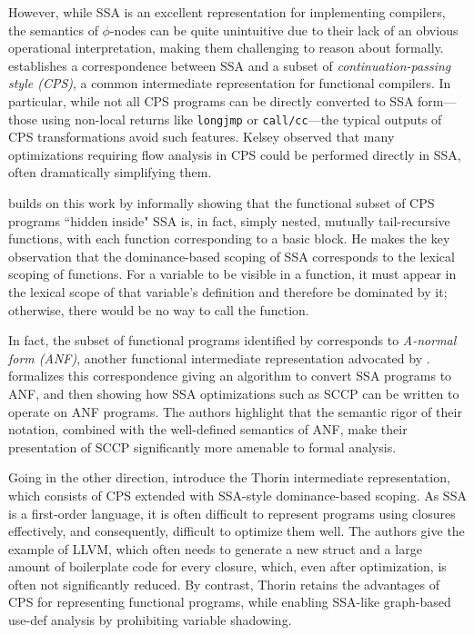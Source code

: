 \documentclass[acmsmall,screen,review]{acmart}
\begin{document}
However, while SSA is an excellent representation for implementing compilers, the semantics of
$\phi$-nodes can be quite unintuitive due to their lack of an obvious operational interpretation,
making them challenging to reason about formally. \citet{kelsey-95-cps} establishes a correspondence
between SSA and a subset of \emph{continuation-passing style (CPS)}, a common intermediate
representation for functional compilers. In particular, while not all CPS programs can be directly
converted to SSA form—those using non-local returns like \texttt{longjmp} or \texttt{call/cc}—the
typical outputs of CPS transformations avoid such features. Kelsey observed that many optimizations
requiring flow analysis in CPS could be performed directly in SSA, often dramatically simplifying
them.

\citet{appel-ssa} builds on this work by informally showing that the functional subset of CPS
programs ``hidden inside" SSA is, in fact, simply nested, mutually tail-recursive functions,
with each function corresponding to a basic block. He makes the key observation that the
dominance-based scoping of SSA corresponds to the lexical scoping of functions. For a variable to be
visible in a function, it must appear in the lexical scope of that variable's definition and
therefore be dominated by it; otherwise, there would be no way to call the function.

In fact, the subset of functional programs identified by \citet{appel-ssa} corresponds to
\emph{A-normal form (ANF)}, another functional intermediate representation advocated by
\citet{flanagan-93-anf}. \citet{chakravarty-functional-ssa-2003} formalizes this correspondence
giving an algorithm to convert SSA programs to ANF, and then showing how SSA optimizations such as
SCCP can be written to operate on ANF programs. The authors highlight that the semantic rigor of
their notation, combined with the well-defined semantics of ANF, make their presentation of SCCP
significantly more amenable to formal analysis.

Going in the other direction, \citet{thorin-12} introduce the Thorin intermediate representation,
which consists of CPS extended with SSA-style dominance-based scoping. As SSA is a first-order
language, it is often difficult to represent programs using closures effectively, and consequently,
difficult to optimize them well. The authors give the example of LLVM, which often needs to generate
a new struct and a large amount of boilerplate code for every closure, which, even after
optimization, is often not significantly reduced. By contrast, Thorin retains the advantages of CPS
for representing functional programs, while enabling SSA-like graph-based use-def analysis by
prohibiting variable shadowing.
\end{document}

